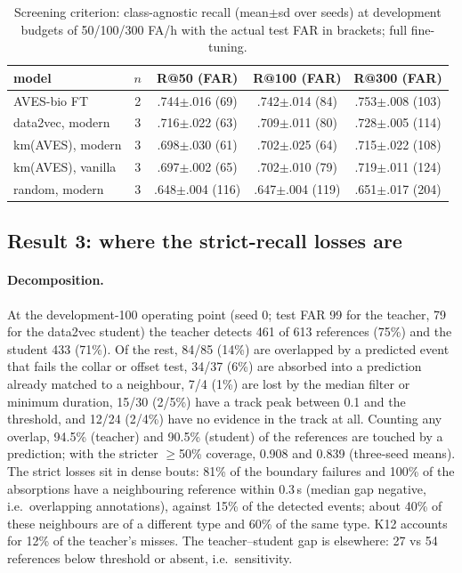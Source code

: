 \documentclass[10pt,twocolumn]{article}
\begin{document}
\begin{table}[t]\centering\small
\caption{Screening criterion: class-agnostic recall (mean$\pm$sd over seeds) at development budgets of 50/100/300 FA/h with the actual test FAR in brackets; full fine-tuning.}
\label{tab:recall}
\begin{tabular}{lcccc}\toprule
model & $n$ & R@50 (FAR) & R@100 (FAR) & R@300 (FAR)\\\midrule
AVES-bio FT & 2 & .744$\pm$.016 (69) & .742$\pm$.014 (84) & .753$\pm$.008 (103)\\
data2vec, modern & 3 & .716$\pm$.022 (63) & .709$\pm$.011 (80) & .728$\pm$.005 (114)\\
km(AVES), modern & 3 & .698$\pm$.030 (61) & .702$\pm$.025 (64) & .715$\pm$.022 (108)\\
km(AVES), vanilla & 3 & .697$\pm$.002 (65) & .702$\pm$.010 (79) & .719$\pm$.011 (124)\\
random, modern & 3 & .648$\pm$.004 (116) & .647$\pm$.004 (119) & .651$\pm$.017 (204)\\
\bottomrule\end{tabular}\end{table}

\subsection{Result 3: where the strict-recall losses are}
\label{sec:r3}
\paragraph{Decomposition.} At the development-100 operating point (seed 0; test FAR 99 for the teacher, 79 for the data2vec student) the teacher detects 461 of 613 references (75\%) and the student 433 (71\%). Of the rest, 84/85 (14\%) are overlapped by a predicted event that fails the collar or offset test, 34/37 (6\%) are absorbed into a prediction already matched to a neighbour, 7/4 (1\%) are lost by the median filter or minimum duration, 15/30 (2/5\%) have a track peak between 0.1 and the threshold, and 12/24 (2/4\%) have no evidence in the track at all. Counting any overlap, 94.5\% (teacher) and 90.5\% (student) of the references are touched by a prediction; with the stricter $\ge$50\% coverage, 0.908 and 0.839 (three-seed means). The strict losses sit in dense bouts: 81\% of the boundary failures and 100\% of the absorptions have a neighbouring reference within 0.3\,s (median gap negative, i.e.\ overlapping annotations), against 15\% of the detected events; about 40\% of these neighbours are of a different type and 60\% of the same type. K12 accounts for 12\% of the teacher's misses. The teacher--student gap is elsewhere: 27 vs 54 references below threshold or absent, i.e.\ sensitivity.
\end{document}
